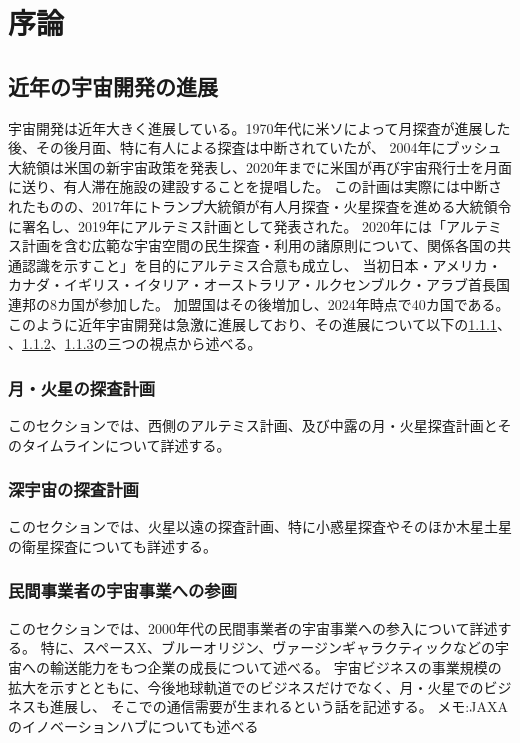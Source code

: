 \chapter{序論}
\section{近年の宇宙開発の進展}
宇宙開発は近年大きく進展している。1970年代に米ソによって月探査が進展した後、その後月面、特に有人による探査は中断されていたが、
2004年にブッシュ大統領は米国の新宇宙政策を発表し、2020年までに米国が再び宇宙飛行士を月面に送り、有人滞在施設の建設することを提唱した。\cite{久保田2009}
この計画は実際には中断されたものの、2017年にトランプ大統領が有人月探査・火星探査を進める大統領令に署名し、2019年にアルテミス計画として発表された。\cite{nasa2020}
2020年には「アルテミス計画を含む広範な宇宙空間の民生探査・利用の諸原則について、関係各国の共通認識を示すこと」を目的にアルテミス合意\cite{artemis_agreement1}も成立し、
当初日本・アメリカ・カナダ・イギリス・イタリア・オーストラリア・ルクセンブルク・アラブ首長国連邦の8カ国が参加した。\cite{artemis_agreement2}
加盟国はその後増加し、2024年時点で40カ国である。\cite{artemis_agreement3}
このように近年宇宙開発は急激に進展しており、その進展について以下の\ref{月・火星の探査計画}、
、\ref{深宇宙の探査計画}、\ref{民間事業者の宇宙事業への参画}の三つの視点から述べる。
\subsection{月・火星の探査計画}
\label{月・火星の探査計画}
このセクションでは、西側のアルテミス計画、及び中露の月・火星探査計画とそのタイムラインについて詳述する。
\subsection{深宇宙の探査計画}
\label{深宇宙の探査計画}
このセクションでは、火星以遠の探査計画、特に小惑星探査やそのほか木星土星の衛星探査についても詳述する。

\subsection{民間事業者の宇宙事業への参画}
\label{民間事業者の宇宙事業への参画}
このセクションでは、2000年代の民間事業者の宇宙事業への参入について詳述する。
特に、スペースX、ブルーオリジン、ヴァージンギャラクティックなどの宇宙への輸送能力をもつ企業の成長について述べる。
宇宙ビジネスの事業規模の拡大を示すとともに、今後地球軌道でのビジネスだけでなく、月・火星でのビジネスも進展し、
そこでの通信需要が生まれるという話を記述する。
メモ:JAXAのイノベーションハブについても述べる

